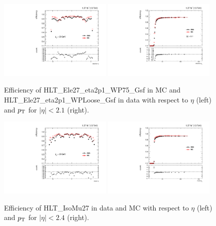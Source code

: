\begin{figure}[htbp]
  \centering
  \includegraphics[width=0.48\textwidth]{figures/sel_effeta_dataMC.pdf}
  \includegraphics[width=0.48\textwidth]{figures/sel_effpt_dataMC.pdf}
  \caption{Efficiency of HLT\_Ele27\_eta2p1\_WP75\_Gsf in MC and HLT\_Ele27\_eta2p1\_WPLoose\_Gsf in data with respect to $\eta$ (left) and $p_\mathrm{T}$ for $|\eta|<2.1$ (right).}
  \label{fig:seleff}
\end{figure}

\begin{figure}[htbp]
  \centering
  \includegraphics[width=0.48\textwidth]{figures/smu_effeta_dataMC.pdf}
  \includegraphics[width=0.48\textwidth]{figures/smu_effpt_dataMC.pdf}
  \caption{Efficiency of HLT\_IsoMu27 in data and MC with respect to $\eta$ (left) and $p_\mathrm{T}$ for $|\eta|<2.4$ (right).}
  \label{fig:smueff}
\end{figure}

